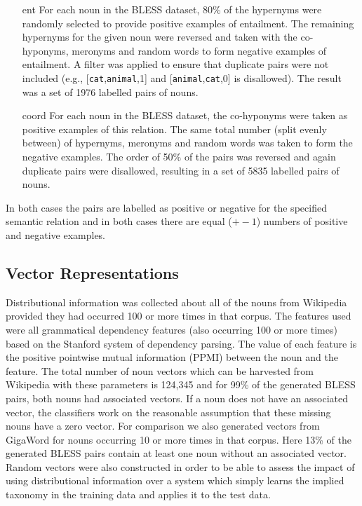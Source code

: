 \documentclass[11pt]{article}
\begin{document}
\begin{itemize}
\item[ent]{For each noun in the BLESS dataset, 80\% of the hypernyms were randomly selected to provide positive examples of entailment.  The remaining hypernyms for the given noun were reversed and taken with the co-hyponyms, meronyms and random words to form negative examples of entailment.  A filter was applied to ensure that duplicate pairs were not included (e.g., [\texttt{cat},\texttt{animal},1] and [\texttt{animal},\texttt{cat},0] is disallowed). The result was a set of 1976 labelled pairs of nouns.}
\item[coord]{For each noun in the BLESS dataset, the co-hyponyms were taken as positive examples of this relation.  The same total number (split evenly between) of hypernyms, meronyms and random words was taken to form the negative examples.  The order of 50\% of the pairs was reversed and again duplicate pairs were disallowed, resulting in a set of 5835 labelled pairs of nouns.}
\end{itemize}

In both cases the pairs are labelled as positive or negative for the specified semantic relation and in both cases there are equal ($+-1$) numbers of positive and negative examples.

\subsection{Vector Representations}

Distributional information was collected about all of the nouns from Wikipedia provided they had occurred 100 or more times in that corpus.  The features used were all grammatical dependency features (also occurring 100 or more times) based on the Stanford system of dependency parsing.  The value of each feature is the positive pointwise mutual information (PPMI) between the noun and the feature. The total number of noun vectors which can be harvested from Wikipedia with these parameters is 124,345 and for 99\% of the generated BLESS pairs, both nouns had associated vectors.   If a noun does not have an associated vector, the classifiers work on the reasonable assumption that these missing nouns have a zero vector.   For comparison we also generated vectors from GigaWord for nouns occurring 10 or more times in that corpus.  Here 13\% of the generated BLESS pairs contain at least one noun without an associated vector.  Random vectors were also constructed in order to be able to assess the impact of using distributional information over a system which simply learns the implied taxonomy in the training data and applies it to the test data.
\end{document}
